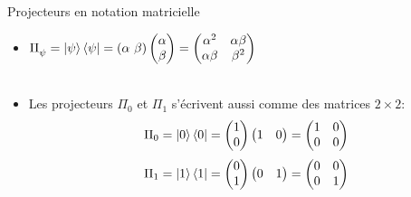 \documentclass[aspectratio=169,12pt]{beamer}
\begin{document}
\begin{frame}{Projecteurs en notation matricielle}
  \begin{itemize}[<+->]
    \setlength{\itemsep}{0.6em}
    \item $\Pi_\psi^{} = \ket \psi \bra \psi = (\alpha \  \beta) \begin{pmatrix}
    \alpha \\ \beta
    \end{pmatrix} = \begin{pmatrix}
      \alpha^2 & \alpha \beta\\
      \alpha \beta & \beta^2
    \end{pmatrix}$\\~\\
    \item Les projecteurs $\Pi_0$ et $\Pi_1$ s'écrivent aussi comme des matrices $2\times 2$:
    $$\Pi_0 = \ket{0}\bra{0} =
      \begin{pmatrix}1\\0\end{pmatrix}\begin{pmatrix}1 & 0\end{pmatrix}
      = \begin{pmatrix}1 & 0\\0 & 0\end{pmatrix}$$
    $$\Pi_1 = \ket{1}\bra{1} =
      \begin{pmatrix}0\\1\end{pmatrix}\begin{pmatrix}0 & 1\end{pmatrix}
      = \begin{pmatrix}0 & 0\\0 & 1\end{pmatrix}$$
  \end{itemize}
\end{frame}
\end{document}
